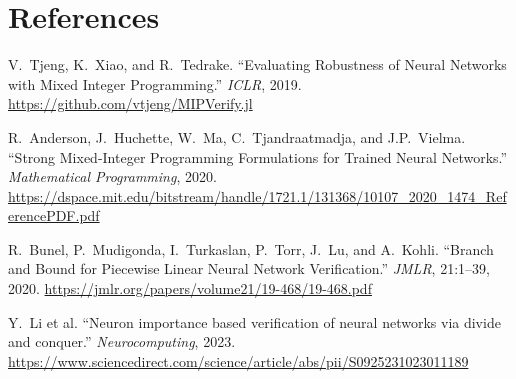 \documentclass[11pt,a4paper]{article}
\begin{document}
\section*{References}

\begin{enumerate}[label={[\arabic*]}, leftmargin=2em]

\item\label{ref:tjeng2019}
  V.~Tjeng, K.~Xiao, and R.~Tedrake.
  ``Evaluating Robustness of Neural Networks with Mixed Integer Programming.''
  \emph{ICLR}, 2019.
  \url{https://github.com/vtjeng/MIPVerify.jl}

\item\label{ref:anderson2020}
  R.~Anderson, J.~Huchette, W.~Ma, C.~Tjandraatmadja, and J.P.~Vielma.
  ``Strong Mixed-Integer Programming Formulations for Trained Neural Networks.''
  \emph{Mathematical Programming}, 2020.
  \url{https://dspace.mit.edu/bitstream/handle/1721.1/131368/10107_2020_1474_ReferencePDF.pdf}

\item\label{ref:bunel2020}
  R.~Bunel, P.~Mudigonda, I.~Turkaslan, P.~Torr, J.~Lu, and A.~Kohli.
  ``Branch and Bound for Piecewise Linear Neural Network Verification.''
  \emph{JMLR}, 21:1--39, 2020.
  \url{https://jmlr.org/papers/volume21/19-468/19-468.pdf}

\item\label{ref:li2023}
  Y.~Li et al.
  ``Neuron importance based verification of neural networks via divide and
  conquer.'' \emph{Neurocomputing}, 2023.
  \url{https://www.sciencedirect.com/science/article/abs/pii/S0925231023011189}

\end{enumerate}
\end{document}

